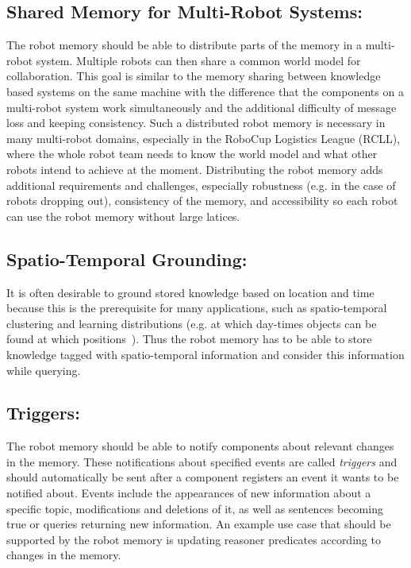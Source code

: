 \subsection{Shared Memory for Multi-Robot Systems:} The robot memory
should be able to distribute parts of the memory in a multi-robot
system. Multiple robots can then share a common world model for
collaboration. This goal is similar to the memory sharing between
knowledge based systems on the same machine with the difference that
the components on a multi-robot system work simultaneously and the
additional difficulty of message loss and keeping consistency. Such a
distributed robot memory is necessary in many multi-robot domains,
especially in the RoboCup Logistics League (RCLL), where the whole
robot team needs to know the world model and what other robots intend
to achieve at the moment.  Distributing the robot memory adds
additional requirements and challenges, especially robustness (e.g. in
the case of robots dropping out), consistency of the memory, and
accessibility so each robot can use the robot memory without large
latices.

\subsection{Spatio-Temporal Grounding:} It is often desirable to ground
stored knowledge based on location and time because this is the
prerequisite for many applications, such as spatio-temporal clustering
and learning distributions (e.g. at which day-times objects can be
found at which positions~\cite{deebul}). Thus the robot
memory has to be able to store knowledge tagged with spatio-temporal
information and consider this information while querying.

\subsection{Triggers:} The robot memory should be able to notify
components about relevant changes in the memory. These notifications
about specified events are called \emph{triggers} and should
automatically be sent after a component registers an event it wants to
be notified about. Events include the appearances of new information
about a specific topic, modifications and deletions of it, as well as
sentences becoming true or queries returning new information.
An example use case that should be supported by the robot memory is
updating reasoner predicates according to changes in the memory.


